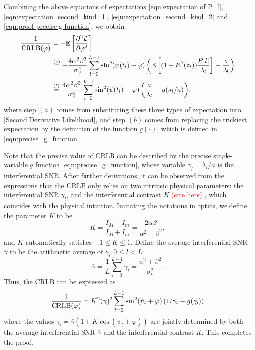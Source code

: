 \documentclass[12pt,draftclsnofoot,journal,onecolumn]{IEEEtran}
\theoremstyle{nonumberplain}
\def \ch {\textcolor{red}{(cite here) }}
\begin{document}
\begin{IEEEproof}
    Combining the above equations of expectations \eqref{eqn:expectation of P_l}, \eqref{eqn:expectation_second_kind_1}, \eqref{eqn:expectation_second_kind_2} and \eqref{eqn:proof precise g function}, we obtain
    \begin{equation}
        \begin{aligned}
        \frac{1}{{\rm CRLB}(\varphi)} & = -\mathbb{E}\left[\frac{\partial^2\mathcal{L}}{\partial\varphi^2}\right] \\
        & \overset{(a)}{=}  -\frac{4\alpha^2\beta^2}{\sigma_v^4}\sum_{l=0}^{L-1}{ \sin^2(\psi(t_l)+\varphi) \left(\mathbb{E}\left[(1-R^2(z_l))\frac{P[l]}{\lambda_l}\right] - \frac{a}{\lambda_l}\right) } \\
        & \overset{(b)}{=} \frac{4\alpha^2\beta^2}{\sigma_v^4}\sum_{l=0}^{L-1}{ \sin^2(\psi(t_l)+\varphi) \left(\frac{a}{\lambda_l}-g(\lambda_l/a)\right)},
        \end{aligned}
        \label{eqn:CRLB}
    \end{equation}
    where step $(a)$ comes from substituting these three types of expectation into \eqref{Second Derivative Likelihood}, and step $(b)$ comes from replacing the trickiest expectation by the definition of the function $g(\cdot)$, which is defined in \eqref{eqn:precise_g_function}.  
    
    Note that the precise value of CRLB can be described by the precise single-variable $g$ function \eqref{eqn:precise_g_function}, whose variable $\gamma_l = \lambda_l / a$ is the interferential SNR. After further derivations, it can be observed from the expressions that the CRLB only relies on two intrinsic physical parameters: the interferential SNR $\gamma_l$, and the interferential contrast $K$  \ch, which coincides with the physical intuition. Imitating the notations in optics, we define the parameter $K$ to be  
    \begin{equation}
        K = \frac{I_M - I_m}{I_M + I_m} = \frac{2\alpha\beta}{\alpha^2+\beta^2},
    \end{equation}
    and $K$ automatically satisfies $-1\leq K\leq 1$. Define the average interferential SNR $\bar{\gamma}$ to be the arithmetic average of $\gamma_l, 0\leq l < L$:
    \begin{equation}
        \bar{\gamma} = \frac{1}{L}\sum_{l=0}^{L-1}{\gamma_l} = \frac{\alpha^2+\beta^2}{\sigma_v^2}.
    \end{equation}
    Thus, the CRLB can be expressed as 
    \begin{equation}
        \frac{1}{{\rm CRLB}(\varphi)} = K^2(\bar{\gamma})^2 \sum_{l=0}^{L-1}{ \sin^2(\psi_l+\varphi) \left(1/\gamma_l-g(\gamma_l)\right) }
    \end{equation}
    where the values $\gamma_l=\bar{\gamma}\left(1+K\cos(\psi_l+\varphi)\right)$ are jointly determined by both the average interferential SNR $\bar{\gamma}$ and the interferential contrast $K$. This completes the proof.
\end{IEEEproof}
\end{document}
